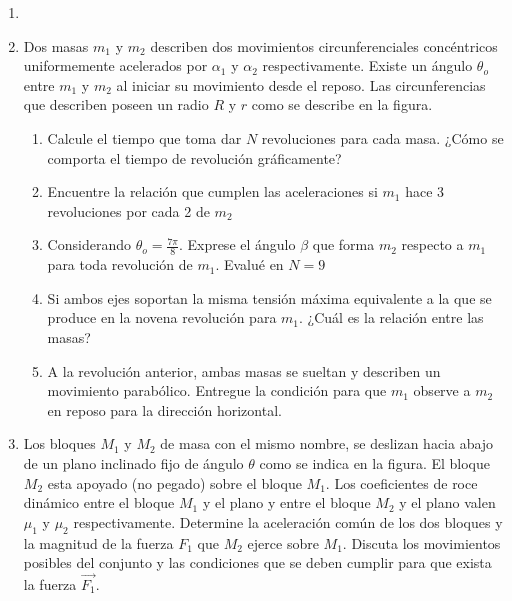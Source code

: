 \documentclass[letterpaper,11pt]{article}
\begin{document}
\vspace{-1cm}
\begin{enumerate}\setlength{\itemsep}{0.4cm}


\item[]

\item Dos masas $m_1$ y $m_2$ describen dos movimientos circunferenciales concéntricos uniformemente acelerados por $\alpha _1$ y $\alpha _2$ respectivamente. Existe un ángulo $\theta _o$ entre $m_1$ y $m_2$ al iniciar su movimiento desde el reposo. Las circunferencias que describen poseen un radio $R$ y $r$ como se describe en la figura.
\begin{figure}[H]
    \centering
    \hspace{1em}
    
\end{figure}

\begin{enumerate}
    \item Calcule el tiempo que toma dar $N$ revoluciones para cada masa. ¿Cómo se comporta el tiempo de revolución gráficamente?
    \item Encuentre la relación que cumplen las aceleraciones si $m_1$ hace 3 revoluciones por cada 2 de $m_2$
    \item Considerando $\theta _o = \frac{7\pi}{8}$. Exprese el ángulo $\beta$ que forma $m_2$ respecto a $m_1$ para toda revolución de $m_1$. Evalué en $N=9$
    \item Si ambos ejes soportan la misma tensión máxima equivalente a la que se produce en la novena revolución para $m_1$. ¿Cuál es la relación entre las masas?
    \item A la revolución anterior, ambas masas se sueltan y describen un movimiento parabólico. Entregue la condición para que $m_1$ observe a $m_2$ en reposo para la dirección horizontal.
\end{enumerate}
\newpage
\item Los bloques $M_1$ y $M_2$ de masa con el mismo nombre, se deslizan hacia abajo de un plano inclinado fijo de ángulo $\theta$ como se indica en la figura. El bloque $M_2$ esta apoyado (no pegado) sobre el bloque $M_1$. Los coeficientes de roce dinámico entre el bloque $M_1$ y el plano y entre el bloque $M_2$ y el plano valen $\mu_1$ y $\mu_2$ respectivamente. Determine la aceleración común de los dos bloques y la magnitud de la fuerza $F_1$ que $M_2$ ejerce sobre $M_1$. Discuta los movimientos posibles del conjunto y las condiciones que se deben cumplir para que exista la fuerza $\vec{F_1}$.


\end{enumerate}
\end{document}
